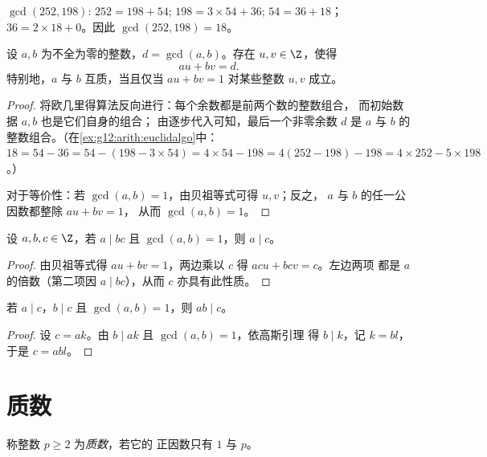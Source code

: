 \begin{example}\label{ex:g12:arith:euclidalgo}
$\gcd(252, 198)$: $252 = 198 + 54$; $198 = 3\times54 + 36$;
$54 = 36 + 18$；$36 = 2 \times 18 + 0$。因此 $\gcd(252,198) = 18$。
\end{example}

\begin{theorem}[贝祖等式]\label{thm:g12:arith:bezout}
设 $a, b$ 为不全为零的整数，$d = \gcd(a,b)$。存在
$u, v \in \Z$，使得
\[
au + bv = d .
\]
特别地，$a$ 与 $b$ 互质，当且仅当 $au + bv = 1$
对某些整数 $u, v$ 成立。
\end{theorem}

\begin{proof}
将欧几里得算法反向进行：每个余数都是前两个数的整数组合，
而初始数据 $a, b$ 也是它们自身的组合；
由逐步代入可知，最后一个非零余数 $d$ 是
$a$ 与 $b$ 的整数组合。（在\cref{ex:g12:arith:euclidalgo}中：
$18 = 54 - 36 = 54 - (198 - 3\times54) = 4\times54 - 198 =
4(252 - 198) - 198 = 4\times252 - 5\times198$。）

对于等价性：若 $\gcd(a,b) = 1$，由贝祖等式可得 $u, v$；反之，
$a$ 与 $b$ 的任一公因数都整除 $au + bv = 1$，
从而 $\gcd(a,b) = 1$。
\end{proof}

\begin{theorem}[高斯引理]\label{thm:g12:arith:gauss}
设 $a, b, c \in \Z$，若 $a \mid bc$ 且 $\gcd(a, b) = 1$，则 $a \mid c$。
\end{theorem}

\begin{proof}
由贝祖等式得 $au + bv = 1$，两边乘以 $c$ 得 $acu + bcv = c$。左边两项
都是 $a$ 的倍数（第二项因 $a \mid bc$），从而
$c$ 亦具有此性质。
\end{proof}

\begin{corollary}\label{cor:g12:arith:coprimeprod}
若 $a \mid c$，$b \mid c$ 且 $\gcd(a,b) = 1$，则 $ab \mid c$。
\end{corollary}

\begin{proof}
设 $c = ak$。由 $b \mid ak$ 且 $\gcd(a,b)=1$，依高斯引理
得 $b \mid k$，记 $k = bl$，于是 $c = abl$。
\end{proof}

\section{质数}

\begin{definition}[质数]\label{def:g12:arith:prime}
称整数 $p \geq 2$ 为\emph{质数}，若它的
正因数只有 $1$ 与 $p$。
\end{definition}


